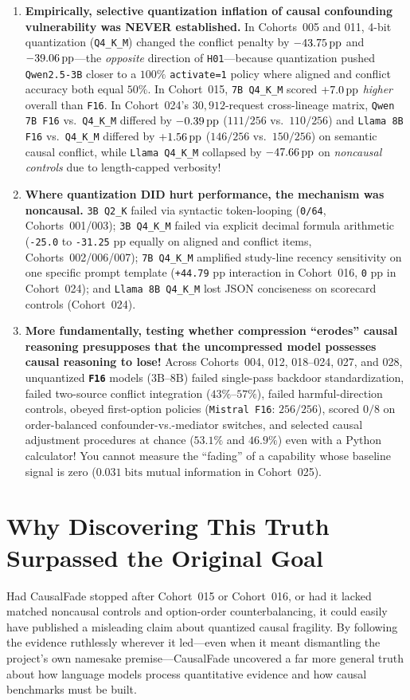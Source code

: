 \begin{enumerate}
  \item \textbf{Empirically, selective quantization inflation of causal confounding vulnerability was NEVER established.} In Cohorts~005 and 011, 4-bit quantization (\texttt{Q4\_K\_M}) changed the conflict penalty by \textbf{$-43.75\,\mathrm{pp}$} and \textbf{$-39.06\,\mathrm{pp}$}---the \emph{opposite} direction of \texttt{H01}---because quantization pushed \texttt{Qwen2.5-3B} closer to a $100\%$ \texttt{activate=1} policy where aligned and conflict accuracy both equal $50\%$. In Cohort~015, \texttt{7B Q4\_K\_M} scored $+7.0\,\mathrm{pp}$ \emph{higher} overall than \texttt{F16}. In Cohort~024's $30{,}912$-request cross-lineage matrix, \texttt{Qwen 7B F16} vs.\ \texttt{Q4\_K\_M} differed by $-0.39\,\mathrm{pp}$ ($111/256$ vs.\ $110/256$) and \texttt{Llama 8B F16} vs.\ \texttt{Q4\_K\_M} differed by $+1.56\,\mathrm{pp}$ ($146/256$ vs.\ $150/256$) on semantic causal conflict, while \texttt{Llama Q4\_K\_M} collapsed by $-47.66\,\mathrm{pp}$ on \emph{noncausal controls} due to length-capped verbosity!
  \item \textbf{Where quantization DID hurt performance, the mechanism was noncausal.} \texttt{3B Q2\_K} failed via syntactic token-looping (\texttt{0/64}, Cohorts~001/003); \texttt{3B Q4\_K\_M} failed via explicit decimal formula arithmetic (\texttt{-25.0} to \texttt{-31.25} pp equally on aligned and conflict items, Cohorts~002/006/007); \texttt{7B Q4\_K\_M} amplified study-line recency sensitivity on one specific prompt template (\texttt{+44.79} pp interaction in Cohort~016, \texttt{0} pp in Cohort~024); and \texttt{Llama 8B Q4\_K\_M} lost JSON conciseness on scorecard controls (Cohort~024).
  \item \textbf{More fundamentally, testing whether compression ``erodes'' causal reasoning presupposes that the uncompressed model possesses causal reasoning to lose!} Across Cohorts~004, 012, 018--024, 027, and 028, unquantized \textbf{\texttt{F16}} models ($3\text{B}$--$8\text{B}$) failed single-pass backdoor standardization, failed two-source conflict integration ($43\%$--$57\%$), failed harmful-direction controls, obeyed first-option policies (\texttt{Mistral F16}: $256/256$), scored $0/8$ on order-balanced confounder-vs.-mediator switches, and selected causal adjustment procedures at chance ($53.1\%$ and $46.9\%$) even with a Python calculator! You cannot measure the ``fading'' of a capability whose baseline signal is zero ($0.031\;\text{bits}$ mutual information in Cohort~025).
\end{enumerate}

\section{Why Discovering This Truth Surpassed the Original Goal}
Had CausalFade stopped after Cohort~015 or Cohort~016, or had it lacked matched noncausal controls and option-order counterbalancing, it could easily have published a misleading claim about quantized causal fragility. By following the evidence ruthlessly wherever it led---even when it meant dismantling the project's own namesake premise---CausalFade uncovered a far more general truth about how language models process quantitative evidence and how causal benchmarks must be built.
